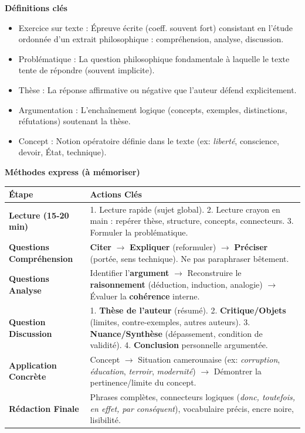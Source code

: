 \documentclass[11pt]{article}
\newcommand{\cle}[1]{{\popxbold\color{popdark}#1}}
\begin{document}
\begin{bilan}
\textbf{Définitions clés}
\begin{itemize}
    \item \cle{Exercice sur texte} : Épreuve écrite (coeff. souvent fort) consistant en l'étude ordonnée d'un extrait philosophique : compréhension, analyse, discussion.
    \item \cle{Problématique} : La question philosophique fondamentale à laquelle le texte tente de répondre (souvent implicite).
    \item \cle{Thèse} : La réponse affirmative ou négative que l'auteur défend explicitement.
    \item \cle{Argumentation} : L'enchaînement logique (concepts, exemples, distinctions, réfutations) soutenant la thèse.
    \item \cle{Concept} : Notion opératoire définie dans le texte (ex: \emph{liberté}, \cle{conscience}, \cle{devoir}, \cle{État}, \cle{technique}).
\end{itemize}

\textbf{Méthodes express (à mémoriser)}
\begin{center}
\begin{tabularx}{\linewidth}{|l|X|}\hline
\rowcolor{popblueL} \textbf{Étape} & \textbf{Actions Clés} \\\hline
\textbf{Lecture (15-20 min)} & 1. Lecture rapide (sujet global). 2. Lecture crayon en main : repérer thèse, structure, concepts, connecteurs. 3. Formuler la problématique. \\\hline
\textbf{Questions Compréhension} & \textbf{Citer} $\to$ \textbf{Expliquer} (reformuler) $\to$ \textbf{Préciser} (portée, sens technique). Ne pas paraphraser bêtement. \\\hline
\textbf{Questions Analyse} & Identifier l'\textbf{argument} $\to$ Reconstruire le \textbf{raisonnement} (déduction, induction, analogie) $\to$ Évaluer la \textbf{cohérence} interne. \\\hline
\textbf{Question Discussion} & 1. \textbf{Thèse de l'auteur} (résumé). 2. \textbf{Critique/Objets} (limites, contre-exemples, autres auteurs). 3. \textbf{Nuance/Synthèse} (dépassement, condition de validité). 4. \textbf{Conclusion} personnelle argumentée. \\\hline
\textbf{Application Concrète} & Concept $\to$ Situation camerounaise (ex: \emph{corruption}, \emph{éducation}, \emph{terroir}, \emph{modernité}) $\to$ Démontrer la pertinence/limite du concept. \\\hline
\textbf{Rédaction Finale} & Phrases complètes, connecteurs logiques (\emph{donc, toutefois, en effet, par conséquent}), vocabulaire précis, encre noire, lisibilité. \\\hline
\end{tabularx}
\end{center}


\end{bilan}
\end{document}
